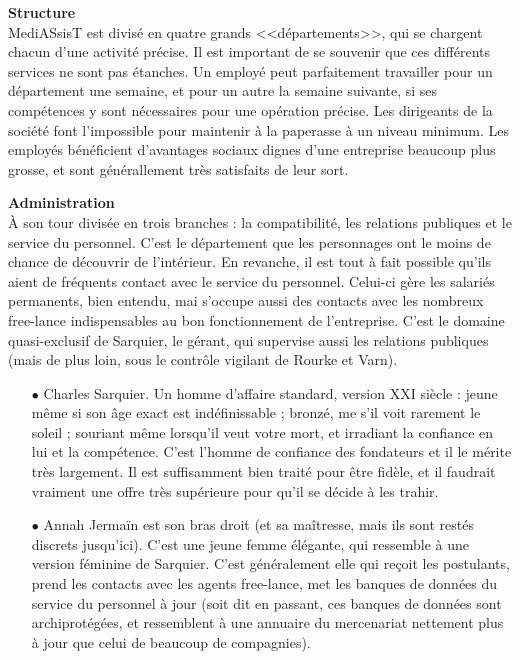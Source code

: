 \documentclass[11pt,twoside,a4paper]{article}
\begin{document}
\begin{multicols}{2}
\textbf{\Large Structure}~\\
MediASsisT est divis{\'e} en quatre grands <<d{\'e}partements>>, qui se chargent chacun d'une activit{\'e} pr{\'e}cise. Il est important de se souvenir que ces diff{\'e}rents services ne sont pas {\'e}tanches. Un employ{\'e} peut parfaitement travailler pour un d{\'e}partement une semaine, et pour un autre la semaine suivante, si ses comp{\'e}tences y sont n{\'e}cessaires pour une op{\'e}ration pr{\'e}cise. Les dirigeants de la soci{\'e}t{\'e} font l'impossible pour maintenir {\`a} la paperasse {\`a} un niveau minimum. Les employ{\'e}s b{\'e}n{\'e}ficient d'avantages sociaux dignes d'une entreprise beaucoup plus grosse, et sont g{\'e}n{\'e}rallement tr{\`e}s satisfaits de leur sort. ~\\

\vfill
\columnbreak

\textbf{\large Administration}~\\
{\`A} son tour divis{\'e}e en trois branches : la compatibilit{\'e}, les relations publiques et le service du personnel. C'est le d{\'e}partement que les personnages ont le moins de chance de d{\'e}couvrir de l'int{\'e}rieur. En revanche, il est tout {\`a} fait possible qu'ils aient de fr{\'e}quents contact avec le service du personnel. Celui-ci g{\`e}re les salari{\'e}s permanents, bien entendu, mai s'occupe aussi des contacts avec les nombreux free-lance indispensables au bon fonctionnement de l'entreprise. C'est le domaine quasi-exclusif de Sarquier, le g{\'e}rant, qui supervise aussi les relations publiques (mais de plus loin, sous le contr{\^o}le vigilant de Rourke et Varn). 
\begin{itemize}
	\item[$\bullet$] Charles Sarquier. Un homme d'affaire standard, version XXI si{\`e}cle : jeune m{\^e}me si son {\^a}ge exact est ind{\'e}finissable ; bronz{\'e}, me s'il voit rarement le soleil ; souriant m{\^e}me lorsqu'il veut votre mort, et irradiant la confiance en lui et la comp{\'e}tence. C'est l'homme de confiance des fondateurs et il le m{\'e}rite tr{\`e}s largement. Il est suffisamment bien trait{\'e} pour {\^e}tre fid{\`e}le, et il faudrait vraiment une offre tr{\`e}s sup{\'e}rieure pour qu'il se d{\'e}cide {\`a} les trahir. 
	\item[$\bullet$] Annah Jerma{\"i}n est son bras droit (et sa ma{\^i}tresse, mais ils sont rest{\'e}s discrets jusqu'ici). C'est une jeune femme {\'e}l{\'e}gante, qui ressemble {\`a} une version f{\'e}minine de Sarquier. C'est g{\'e}n{\'e}ralement elle qui re\c{c}oit les postulants, prend les contacts avec les agents free-lance, met les banques de donn{\'e}es du service du personnel {\`a} jour (soit dit en passant, ces banques de donn{\'e}es sont archiprot{\'e}g{\'e}es, et ressemblent {\`a} une annuaire du mercenariat nettement plus {\`a} jour que celui de beaucoup de compagnies). 
\end{itemize} %


\end{multicols}
\end{document}
